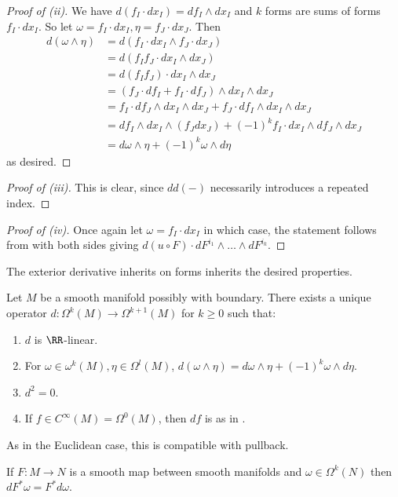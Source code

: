 \begin{proof}[Proof of (ii)]
    We have $d(f_{I}\cdot dx_{I})=df_{I}\wedge dx_{I}$ and $k$ forms are sums of forms $f_{I}\cdot dx_{I}$. So let $\omega=f_{I}\cdot dx_{I},\eta=f_{J}\cdot dx_{J}$. Then 
    \begin{align*}
        d(\omega\wedge\eta) &= d(f_{I}\cdot dx_{I}\wedge f_{J}\cdot dx_{J}) \\
        &= d(f_{I}f_{J}\cdot dx_{I}\wedge dx_{J}) \\
        &= d(f_{I}f_{J})\cdot dx_{I}\wedge dx_{J}\\
        &= (f_{J}\cdot df_{I}+f_{I}\cdot df_{J})\wedge dx_{I}\wedge dx_{J} \\
        &= f_{I}\cdot df_{J}\wedge dx_{I}\wedge dx_{J}+f_{J}\cdot df_{I}\wedge dx_{I}\wedge dx_{J} \\
        &= df_{I}\wedge dx_{I}\wedge (f_{J}dx_{J}) + (-1)^{k}f_{I}\cdot dx_{I}\wedge df_{J}\wedge dx_{J} \\
        &= d\omega\wedge\eta+(-1)^{k}\omega\wedge d\eta
    \end{align*}
    as desired. 
\end{proof}
\begin{proof}[Proof of (iii)]
    This is clear, since $dd(-)$ necessarily introduces a repeated index. 
\end{proof}
\begin{proof}[Proof of (iv)]
    Once again let $\omega=f_{I}\cdot dx_{I}$ in which case, the statement follows from  with both sides giving $d(u\circ F)\cdot dF^{i_{1}}\wedge\dots\wedge dF^{i_{k}}$. 
\end{proof}
The exterior derivative inherits on forms inherits the desired properties. 
\begin{theorem}\label{thm: properties of exterior derivative on forms}
    Let $M$ be a smooth manifold possibly with boundary. There exists a unique operator $d:\Omega^{k}(M)\to\Omega^{k+1}(M)$ for $k\geq 0$ such that:
    \begin{enumerate}[label=(\roman*)]
        \item $d$ is $\RR$-linear. 
        \item For $\omega\in\omega^{k}(M),\eta\in\Omega^{l}(M)$, $d(\omega\wedge\eta)=d\omega\wedge\eta+(-1)^{k}\omega\wedge d\eta$. 
        \item $d^{2}=0$. 
        \item If $f\in C^{\infty}(M)=\Omega^{0}(M)$, then $df$ is as in . 
    \end{enumerate}
\end{theorem}
As in the Euclidean case, this is compatible with pullback. 
\begin{corollary}\label{naturality of forms}
    If $F:M\to N$ is a smooth map between smooth manifolds and $\omega\in\Omega^{k}(N)$ then $dF^{*}\omega=F^{*}d\omega$. 
\end{corollary}
